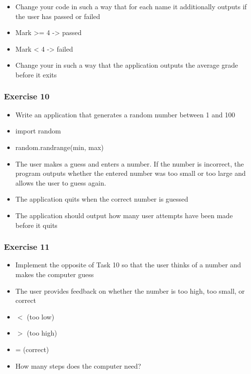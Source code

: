 \documentclass[10pt, a4paper]{beamer} %
\begin{document}
{\begin{frame}
\framebreak

\begin{itemize}
    \item Change your code in such a way that for each name it additionally outputs if the user has passed or failed
    \item Mark >= 4 -> passed
    \item Mark < 4 -> failed
\end{itemize}

\framebreak

\begin{itemize}
    \item Change your in such a way that the application outputs the average grade before it exits
\end{itemize}


\end{frame}

\begin{frame}[c, fragile]\frametitle{Exercise 10}
    
\begin{itemize}
\item  Write an application that generates a random number between 1
and 100
\item  import random
\item  random.randrange(min, max)
\item  The user makes a guess and enters a number. If the number is incorrect, the program outputs whether the entered number was too small or too large and allows the user to guess again.
\item  The application quits when the correct number is guessed
\item  The application should output how many user attempts have been
made before it quits
\end{itemize}

\end{frame}

\begin{frame}[c, fragile]\frametitle{Exercise 11}
    
    \begin{itemize}
        \item Implement the opposite of Task 10 so that the user thinks of a number and makes the computer guess
        \item The user provides feedback on whether the number is too high, too small, or correct
        \item $<$ (too low)
        \item $>$ (too high)
        \item = (correct)
        \item How many steps does the computer need?
    \end{itemize}
\end{frame}

}
\end{document}

